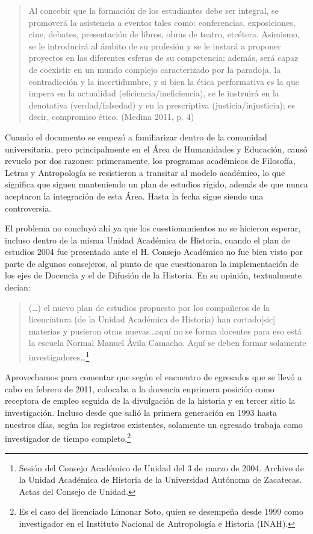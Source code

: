 \begin{quote}
Al concebir que la formación de los estudiantes debe ser integral, se promoverá
la asistencia a eventos tales como: conferencias, exposiciones, cine, debates,
presentación de libros, obras de teatro, etcétera. Asimismo, se le introducirá
al ámbito de su profesión y se le instará a proponer proyectos en las
diferentes esferas de su competencia; además, será capaz de coexistir en un
mundo complejo caracterizado por la paradoja, la contradicción y la
incertidumbre, y si bien la ética performativa es la que impera  en la
actualidad (eficiencia\slash{}ineficiencia), se le instruirá en la denotativa
(verdad\slash{}falsedad) y en la prescriptiva (justicia\slash{}injusticia); es decir,
compromiso ético. (Medina 2011, p. 4)
\end{quote}

\bigskip
Cuando el documento se empezó a familiarizar dentro de la comunidad
universitaria, pero principalmente en el Área de Humanidades y Educación, causó
revuelo por dos razones: primeramente, los programas académicos de Filosofía,
Letras y Antropología se resistieron a transitar al modelo académico, lo que
significa que siguen manteniendo un plan de estudios rígido,  además de que
nunca aceptaron la integración de esta Área. Hasta la fecha sigue siendo una
controversia. 


El problema no concluyó ahí ya que los cuestionamientos no se hicieron esperar,
incluso dentro de la misma Unidad Académica de Historia,  cuando el plan de
estudios 2004 fue presentado ante el H. Consejo Académico no
fue bien visto por parte de algunos consejeros, al punto de que cuestionaron la
implementación de los ejes de Docencia y el de Difusión de la Historia. En su
opinión, textualmente decían:

\begin{quotation}
(\ldots) el nuevo plan de estudios propuesto por los compañeros de la licenciatura (de la Unidad Académica de Historia) han cortado[sic] materias y pusieron otras nuevas\ldots aquí no se forma docentes para eso está la escuela Normal Manuel Ávila
Camacho. Aquí se deben formar solamente
investigadores\ldots\footnote{Sesión del Consejo Académico de Unidad del 3 de marzo de 2004. Archivo de la Unidad Académica de Historia de la Universidad Autónoma de Zacatecas. Actas del Consejo de Unidad.}
\end{quotation}

\bigskip
Aprovechamos para comentar que según el encuentro de egresados que se llevó a
cabo en febrero de 2011, colocaba a la docencia en\linebreak primera posición como
receptora de empleo seguida de la divulgación de la historia y en tercer sitio
la investigación. Incluso desde que salió la primera generación en 1993 hasta
nuestros días, según los registros existentes, solamente un egresado trabaja
como investigador de tiempo completo.\footnote{Es
el caso del licenciado Limonar Soto, quien se desempeña desde 1999 como
investigador en el Instituto Nacional de Antropología e Historia (INAH).}

